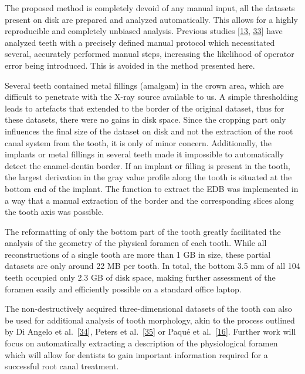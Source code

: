\documentclass[
  american,
]{article}
\begin{document}
The proposed method is completely devoid of any manual input, all the datasets present on disk are prepared and analyzed automatically.
This allows for a highly reproducible and completely unbiased analysis.
Previous studies {[}\protect\hyperlink{ref-19SVNdOdA}{13}, \protect\hyperlink{ref-jsWNcnau}{33}{]} have analyzed teeth with a precisely defined manual protocol which necessitated several, accurately performed manual steps, increasing the likelihood of operator error being introduced.
This is avoided in the method presented here.

Several teeth contained metal fillings (amalgam) in the crown area, which are difficult to penetrate with the X-ray source available to us.
A simple thresholding leads to artefacts that extended to the border of the original dataset, thus for these datasets, there were no gains in disk space.
Since the cropping part only influences the final size of the dataset on disk and not the extraction of the root canal system from the tooth, it is only of minor concern.
Additionally, the implants or metal fillings in several teeth made it impossible to automatically detect the enamel-dentin border.
If an implant or filling is present in the tooth, the largest derivation in the gray value profile along the tooth is situated at the bottom end of the implant.
The function to extract the EDB was implemented in a way that a manual extraction of the border and the corresponding slices along the tooth axis was possible.

The reformatting of only the bottom part of the tooth greatly facilitated the analysis of the geometry of the physical foramen of each tooth.
While all reconstructions of a single tooth are more than 1 GB in size, these partial datasets are only around 22 MB per tooth.
In total, the bottom 3.5 mm of all 104 teeth occupied only 2.3 GB of disk space, making further assessment of the foramen easily and efficiently possible on a standard office laptop.

The non-destructively acquired three-dimensional datasets of the tooth can also be used for additional analysis of tooth morphology, akin to the process outlined by Di Angelo et al.~{[}\protect\hyperlink{ref-1Egw08k0d}{34}{]}, Peters et al.~{[}\protect\hyperlink{ref-RxErLYuw}{35}{]} or Paqué et al.~{[}\protect\hyperlink{ref-DLVCfdzK}{16}{]}.
Further work will focus on automatically extracting a description of the physiological foramen which will allow for dentists to gain important information required for a successful root canal treatment.
\end{document}

